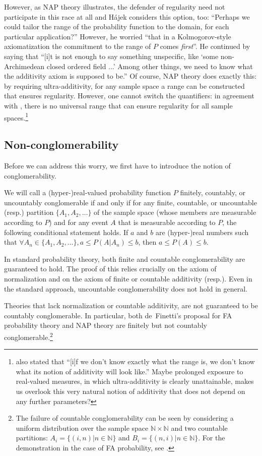 However, as NAP theory illustrates, the defender of regularity need not participate in this race at all and H{\'a}jek considers this option, too: ``Perhaps we could tailor the range of the probability function to the domain, for each particular application?'' However, he worried ``that in a Kolmogorov-style axiomatization the commitment to the range of $P$ comes \emph{first}''. He continued by saying that ``[i]t is not enough to say something unspecific, like `some non-Archimedean closed ordered field ...' Among other things, we need to know
what the additivity axiom is supposed to be.'' Of course, NAP theory does exactly this: by requiring ultra-additivity, for any  sample space a range can be constructed that ensures regularity. However, one cannot switch the quantifiers: in agreement with \citet{Pruss:2013}, there is no universal range that can ensure regularity for all sample spaces.\footnote{\citet{Hajek:2012b} also stated that ``[i]f we don't know exactly what the range is, we don't know what its notion of additivity will look like.'' Maybe prolonged exposure to real-valued measures, in which ultra-additivity is clearly unattainable, makes us overlook this very natural notion of additivity that does not depend on any further parameters?}

\subsection{Non-conglomerability}
Before we can address this worry, we first have to introduce the notion of conglomerability.

We will call a (hyper-)real-valued probability function $P$ finitely, countably, or uncountably conglomerable if and only if for any finite, countable, or uncountable (resp.) partition $\{A_1, A_2, \ldots \}$ of the sample space (whose members are measurable according to $P$) and for any event $A$ that is measurable according to $P$, the following conditional statement holds. If $a$ and $b$ are (hyper-)real numbers such that $\forall A_n \in \{A_1, A_2, \ldots \}, a \leq P(A|A_n) \leq b$, then $a \leq P(A) \leq b$.

In standard probability theory, both finite and countable conglomerability are guaranteed to hold. The proof of this relies crucially on the axiom of normalization and on the axiom of finite or countable additivity (resp.). Even in the standard approach, uncountable conglomerability does not hold in general.

Theories that lack normalization or countable additivity, are not guaranteed to be countably conglomerable. In particular, both de~Finetti's proposal for FA probability theory and NAP theory are finitely but not countably conglomerable.\footnote{The failure of countable conglomerability can be seen by considering a uniform distribution over the sample space $\mathbb{N}\times\mathbb{N}$ and two countable partitions: $A_i = \{(i,n) | n\in \mathbb{N} \}$ and $B_i=\{(n,i) | n \in \mathbb{N} \}$. For the demonstration in the case of FA probability, see \citet[Ch.~5]{DeFinetti:1972}.}

